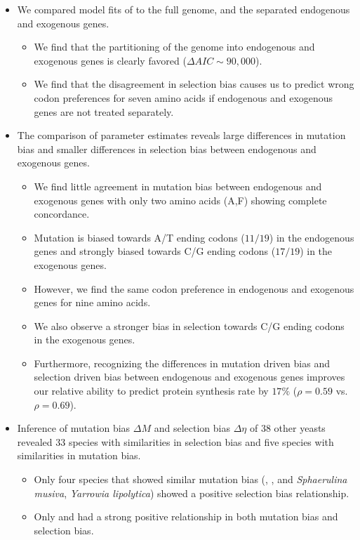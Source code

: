 \documentclass[12pt]{article}
\begin{document}
\begin{itemize}
	\item We compared model fits of \ROC to the full \kluyveri genome, and the separated endogenous and exogenous genes.
	\begin{itemize}
		\item We find that the partitioning of the \kluyveri genome into endogenous and exogenous genes is clearly favored ($\Delta AIC \sim 90,000$).
		\item We find that the disagreement in selection bias causes us to predict wrong codon preferences for seven amino acids if endogenous and exogenous genes are not treated separately.
	\end{itemize}
	\item The comparison of parameter estimates reveals large differences in mutation bias and smaller differences in selection bias between endogenous and exogenous genes.
	\begin{itemize}
		\item We find little agreement in mutation bias between endogenous and exogenous genes with only two amino acids (A,F) showing complete concordance.
		\item Mutation is biased towards A/T ending codons ($11/19$) in the endogenous genes and strongly biased towards C/G ending codons ($17/19$) in the exogenous genes.
		\item However, we find the same codon preference in endogenous and exogenous genes for nine amino acids. 
		\item We also observe a stronger bias in selection towards C/G ending codons in the exogenous genes. 
		\item Furthermore, recognizing the differences in mutation driven bias and selection driven bias between endogenous and exogenous genes improves our relative ability to predict protein synthesis rate by $17 \%$ ($\rho = 0.59$ vs. $\rho = 0.69$).
	\end{itemize}
	\item Inference of mutation bias $\Delta M$ and selection bias $\Delta \eta$ of 38 other yeasts revealed 33 species with similarities in selection bias and five species with similarities in mutation bias.
	\begin{itemize}
		\item Only four species that showed similar mutation bias (\gossypii, \dubl, and \textit{Sphaerulina musiva}, \textit{Yarrowia lipolytica}) showed a positive selection bias relationship.
		\item Only \gossypii and \dubl had a strong positive relationship in both mutation bias and selection bias. 

\end{itemize}
\end{itemize}
\end{document}
